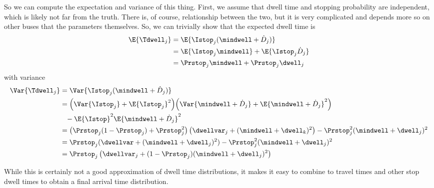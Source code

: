 So we can compute the expectation and variance of this thing.
First, we assume that dwell time and stopping probability are independent,
which is likely not far from the truth.
There is, of course, relationship between the two,
but it is very complicated and depends more so on other buses
that the parameters themselves.
So, we can trivially show that the expected dwell time is
\begin{align}
\label{eq:trip_dwell_mean}
\E{\Tdwell_{j}}
&= \E{\Istop_{j} (\mindwell + \dot D_{j})} \nonumber \\
&= \E{\Istop_{j} \mindwell} + \E{\Istop_{j}\dot D_{j}} \nonumber \\
&= \Prstop_{j}\mindwell + \Prstop_{j}\dwell_{j}
\end{align}
with variance
\begin{align}
\label{eq:trip_dwell_var}
\Var{\Tdwell_{j}}
&= \Var{\Istop_{j} (\mindwell + \dot D_{j})} \nonumber \\
&= \Big(\Var{\Istop_{j}} + \E{\Istop_{j}}^2\Big)
    \Big(\Var{\mindwell + \dot D_{j}} + \E{\mindwell + \dot D_{j}}^2\Big)
    \nonumber \\
    &\phantom{=} - \E{\Istop\vphantom{\dot D_{j}}}^2 \E{\mindwell + \dot D_{j}}^2 \nonumber \\
&= \left(\Prstop_{j}(1-\Prstop_{j}) + \Prstop_{j}^2\right)
    \left(\dwellvar_{j} + (\mindwell + \dwell_{k})^2\right) -
    \Prstop_{j}^2 (\mindwell + \dwell_{j})^2 \nonumber  \\
&= \Prstop_{j}(\dwellvar + (\mindwell + \dwell_{j})^2) -
    \Prstop_{j}^2(\mindwell + \dwell_{j})^2  \nonumber \\
&= \Prstop_{j} \left(
    \dwellvar_{j} + (1-\Prstop_{j})(\mindwell + \dwell_{j})^2
\right)
\end{align}



While this is certainly not a good approximation of dwell time distributions,
it makes it easy to combine to travel times and other stop dwell times
to obtain a final arrival time distribution.

